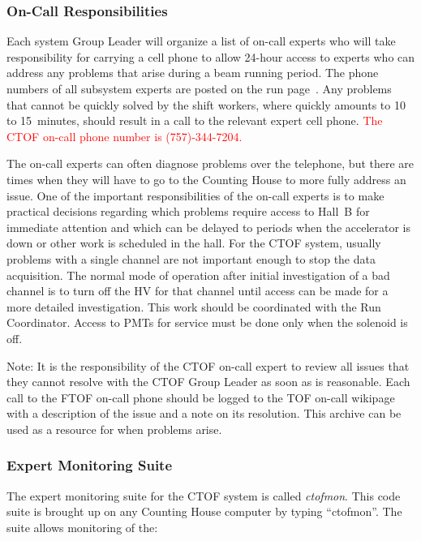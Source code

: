 \documentclass[12pt]{article}
\begin{document}
\subsubsection{On-Call Responsibilities}
\label{oncall}

Each system Group Leader will organize a list of on-call experts who will take responsibility for carrying a
cell phone to allow 24-hour access to experts who can address any problems that arise during a beam running
period. The phone numbers of all subsystem experts are posted on the run page~\cite{run-page}. Any problems
that cannot be quickly solved by the shift workers, where quickly amounts to 10 to 15~minutes, should result
in a call to the relevant expert cell phone. \textcolor{red}{The CTOF on-call phone number is (757)-344-7204.} 

The on-call experts can often diagnose problems over the telephone, but there are times when they will have
to go to the Counting House to more fully address an issue. One of the important responsibilities of the
on-call experts is to make practical decisions regarding which problems require access to Hall~B for immediate 
attention and which can be delayed to periods when the accelerator is down or other work is scheduled in the
hall. For the CTOF system, usually problems with a single channel are not important enough to stop the data
acquisition. The normal mode of operation after initial investigation of a bad channel is to turn off the HV
for that channel until access can be made for a more detailed investigation. This work should be coordinated
with the Run Coordinator. Access to PMTs for service must be done only when the solenoid is off.

Note: It is the responsibility of the CTOF on-call expert to review all issues that they cannot resolve with
the CTOF Group Leader as soon as is reasonable. Each call to the FTOF on-call phone should be logged to the
TOF on-call wikipage \cite{tof-oncall} with a description of the issue and a note on its resolution. This
archive can be used as a resource for when problems arise.

\subsubsection{Expert Monitoring Suite}
\label{ctofmon}

The expert monitoring suite for the CTOF system is called {\it ctofmon}. This code suite is brought up on
any Counting House computer by typing ``ctofmon''. The suite allows monitoring of the:
\end{document}

